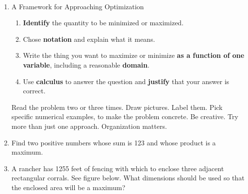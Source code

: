 \documentclass[11pt,fleqn]{article}
\begin{document}
\vspace*{-0.7in}

\begin{center}
  \Large{}\\
\end{center}
\begin{enumerate}
\item A Framework for Approaching Optimization
\begin{enumerate}
\item \textbf{Identify} the quantity to be minimized or maximized.
\item Chose \textbf{notation} and explain what it means.
\item Write the thing you want to maximize or minimize \textbf{as a function of one variable}, including a reasonable \textbf{domain}.
\item Use \textbf{calculus} to answer the question and \textbf{justify} that your answer is correct.
\end{enumerate}
Read the problem two or three times. Draw pictures. Label them. Pick specific numerical examples, to make the problem concrete. Be creative. Try more than just one approach. Organization matters.
\item  Find two positive numbers whose sum is 123 and whose product is a maximum.
\vfill
\newpage
\item A rancher has 1255 feet of fencing with which to
  enclose three adjacent rectangular corrals. See figure below. What dimensions should
  be used so that the enclosed area will be a maximum?\\
  
\vfill
   
\end{enumerate}
\end{document}
